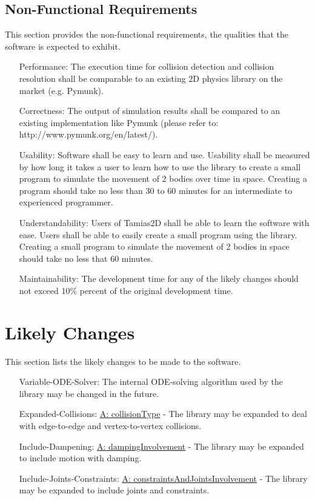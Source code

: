 \documentclass[12pt]{article}
\begin{document}
\subsection{Non-Functional Requirements}
\label{Sec:NFRs}
This section provides the non-functional requirements, the qualities that the software is expected to exhibit.

\begin{itemize}
\item[Performance:\phantomsection\label{performance}]{The execution time for collision detection and collision resolution shall be comparable to an existing 2D physics library on the market (e.g. Pymunk).}
\item[Correctness:\phantomsection\label{correctness}]{The output of simulation results shall be compared to an existing implementation like Pymunk (please refer to: http://www.pymunk.org/en/latest/).}
\item[Usability:\phantomsection\label{usability}]{Software shall be easy to learn and use. Usability shall be measured by how long it takes a user to learn how to use the library to create a small program to simulate the movement of 2 bodies over time in space. Creating a program should take no less than 30 to 60 minutes for an intermediate to experienced programmer.}
\item[Understandability:\phantomsection\label{understandability}]{Users of Tamias2D shall be able to learn the software with ease. Users shall be able to easily create a small program using the library. Creating a small program to simulate the movement of 2 bodies in space should take no less that 60 minutes.}
\item[Maintainability:\phantomsection\label{maintainability}]{The development time for any  of the likely changes should not exceed 10$\%$ percent of the original development time.}
\end{itemize}
\section{Likely Changes}
\label{Sec:LCs}
This section lists the likely changes to be made to the software.

\begin{itemize}
\item[Variable-ODE-Solver:\phantomsection\label{lcVODES}]{The internal ODE-solving algorithm used by the library may be changed in the future.}
\item[Expanded-Collisions:\phantomsection\label{lcEC}]{\hyperref[assumpCT]{A: collisionType} - The library may be expanded to deal with edge-to-edge and vertex-to-vertex collisions.}
\item[Include-Dampening:\phantomsection\label{lcID}]{\hyperref[assumpDI]{A: dampingInvolvement} - The library may be expanded to include motion with damping.}
\item[Include-Joints-Constraints:\phantomsection\label{lcIJC}]{\hyperref[assumpCAJI]{A: constraintsAndJointsInvolvement} - The library may be expanded to include joints and constraints.}
\end{itemize}
\end{document}
